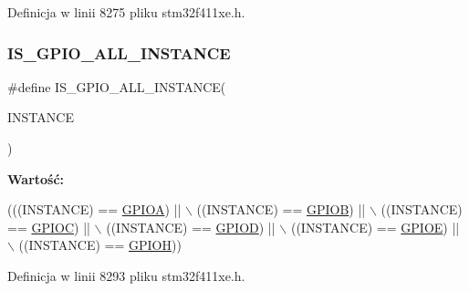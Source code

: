 Definicja w linii 8275 pliku stm32f411xe.\+h.

\mbox{\label{group___exported__macros_ga783626dd2431afebea836a102e318957}} 
\subsubsection{\texorpdfstring{I\+S\+\_\+\+G\+P\+I\+O\+\_\+\+A\+L\+L\+\_\+\+I\+N\+S\+T\+A\+N\+CE}{IS\_GPIO\_ALL\_INSTANCE}}
{\footnotesize\ttfamily \#define I\+S\+\_\+\+G\+P\+I\+O\+\_\+\+A\+L\+L\+\_\+\+I\+N\+S\+T\+A\+N\+CE(\begin{DoxyParamCaption}\item[{}]{I\+N\+S\+T\+A\+N\+CE }\end{DoxyParamCaption})}

{\bfseries Wartość\+:}
\begin{DoxyCode}
(((INSTANCE) == \hyperlink{group___peripheral__declaration_gac485358099728ddae050db37924dd6b7}{GPIOA}) || \(\backslash\)
                                        ((INSTANCE) == \hyperlink{group___peripheral__declaration_ga68b66ac73be4c836db878a42e1fea3cd}{GPIOB}) || \(\backslash\)
                                        ((INSTANCE) == \hyperlink{group___peripheral__declaration_ga2dca03332d620196ba943bc2346eaa08}{GPIOC}) || \(\backslash\)
                                        ((INSTANCE) == \hyperlink{group___peripheral__declaration_ga7580b1a929ea9df59725ba9c18eba6ac}{GPIOD}) || \(\backslash\)
                                        ((INSTANCE) == \hyperlink{group___peripheral__declaration_gae04bdb5e8acc47cab1d0532e6b0d0763}{GPIOE}) || \(\backslash\)
                                        ((INSTANCE) == \hyperlink{group___peripheral__declaration_gadeacbb43ae86c879945afe98c679b285}{GPIOH}))
\end{DoxyCode}


Definicja w linii 8293 pliku stm32f411xe.\+h.

\mbox{\label{group___exported__macros_ga6696ebd1aea007a19e831517f3e1f497}} 
